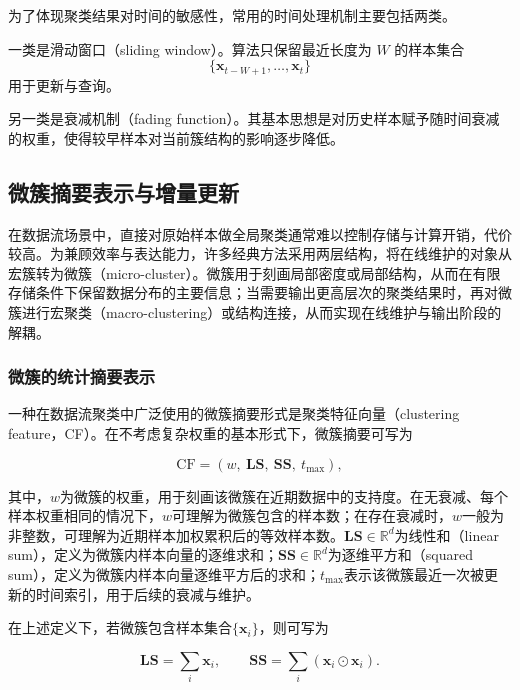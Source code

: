 \documentclass{xdupgthesis}
\begin{document}
为了体现聚类结果对时间的敏感性，常用的时间处理机制主要包括两类。

一类是滑动窗口（sliding window）。算法只保留最近长度为 $W$ 的样本集合
\[
\{\mathbf{x}_{t-W+1},\ldots,\mathbf{x}_t\}
\]
用于更新与查询。

另一类是衰减机制（fading function）。其基本思想是对历史样本赋予随时间衰减的权重，使得较早样本对当前簇结构的影响逐步降低。



\subsection{微簇摘要表示与增量更新}

在数据流场景中，直接对原始样本做全局聚类通常难以控制存储与计算开销，代价较高。为兼顾效率与表达能力，许多经典方法采用两层结构，将在线维护的对象从宏簇转为微簇（micro-cluster）。微簇用于刻画局部密度或局部结构，从而在有限存储条件下保留数据分布的主要信息；当需要输出更高层次的聚类结果时，再对微簇进行宏聚类（macro-clustering）或结构连接，从而实现在线维护与输出阶段的解耦。

\subsubsection{微簇的统计摘要表示}

一种在数据流聚类中广泛使用的微簇摘要形式是聚类特征向量（clustering feature，CF）。在不考虑复杂权重的基本形式下，微簇摘要可写为

\begin{equation}
	\mathrm{CF}=\left(w,\ \mathbf{LS},\ \mathbf{SS},\ t_{\max}\right),
\end{equation}

其中，$w$为微簇的权重，用于刻画该微簇在近期数据中的支持度。在无衰减、每个样本权重相同的情况下，$w$可理解为微簇包含的样本数；在存在衰减时，$w$一般为非整数，可理解为近期样本加权累积后的等效样本数。$\mathbf{LS}\in\mathbb{R}^d$为线性和（linear sum），定义为微簇内样本向量的逐维求和；$\mathbf{SS}\in\mathbb{R}^d$为逐维平方和（squared sum），定义为微簇内样本向量逐维平方后的求和；$t_{\max}$表示该微簇最近一次被更新的时间索引，用于后续的衰减与维护。


在上述定义下，若微簇包含样本集合$\{\mathbf{x}_i\}$，则可写为

\begin{equation}
	\mathbf{LS}=\sum_i \mathbf{x}_i,\qquad
	\mathbf{SS}=\sum_i \left(\mathbf{x}_i\odot \mathbf{x}_i\right).
\end{equation}
\end{document}
